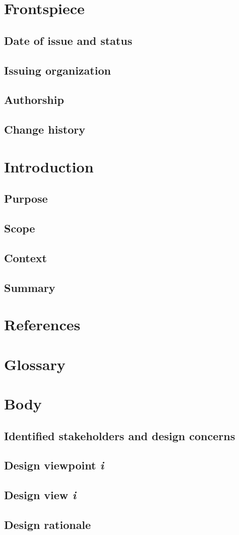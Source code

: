 \documentclass[letterpaper,10pt,serif, draftclsnofoot,onecolumn, compsoc, titlepage]{IEEEtran}
\begin{document}
\section{Frontspiece}
\subsection{Date of issue and status}
\subsection{Issuing organization}
\subsection{Authorship}
\subsection{Change history}

\section{Introduction}
\subsection{Purpose}
\subsection{Scope}
\subsection{Context}
\subsection{Summary}

\section{References}

\section{Glossary}

\section{Body}
\subsection{Identified stakeholders and design concerns}
\subsection{Design viewpoint \emph{i}}
\subsection{Design view \emph{i}}
\subsection{Design rationale}
\end{document}
